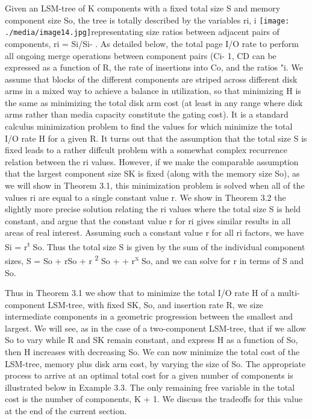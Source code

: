 \documentclass[a4paper,12pt,notitlepage,twoside,openright]{article}
\begin{document}
Given an LSM-tree of K components with a fixed total size S and memory
component size So, the tree is totally described by the variables ri, i
\texttt{[image: ./media/image14.jpg]}representating
size ratios between adjacent pairs of components, ri = Si/Si- . As
detailed below, the total page I/O rate to perform all ongoing merge
operations between component pairs (Ci- 1, CD can be expressed as a
function of R, the rate of insertions into Co, and the ratios "i. We
assume that blocks of the different components are striped across
different disk arms in a mixed way to achieve a balance in utilization,
so that minimizing H is the same as minimizing the total disk arm cost
(at least in any range where disk arms rather than media capacity
constitute the gating cost). It is a standard calculus minimization
problem to find the values for which minimize the total I/O rate H for a
given R. It turns out that the assumption that the total size S is fixed
leads to a rather diffcult problem with a somewhat complex recurrence
relation between the ri values. However, if we make the comparable
assumption that the largest component size SK is fixed (along with the
memory size So), as we will show in Theorem 3.1, this minimization
problem is solved when all of the values ri are equal to a single
constant value r. We show in Theorem 3.2 the slightly more precise
solution relating the ri values where the total size S is held constant,
and argue that the constant value r for ri gives similar results in all
areas of real interest. Assuming such a constant value r for all ri
factors, we have Si = r\textsuperscript{t} So. Thus the total size S is
given by the sum of the individual component sizes, S = So + rSo + r
\textsuperscript{2} So + + r\textsuperscript{x} So, and we can solve for
r in terms of S and So.

Thus in Theorem 3.1 we show that to minimize the total I/O rate H of a
multi-component LSM-tree, with fixed SK, So, and insertion rate R, we
size intermediate components in a geometric progression between the
smallest and largest. We will see, as in the case of a two-component
LSM-tree, that if we allow So to vary while R and SK remain constant,
and express H as a function of So, then H increases with decreasing So.
We can now minimize the total cost of the LSM-tree, memory plus disk arm
cost, by varying the size of So. The appropriate process to arrive at an
optimal total cost for a given number of components is illustrated below
in Example 3.3. The only remaining free variable in the total cost is
the number of components, K + 1. We discuss the tradeoffs for this value
at the end of the current section.
\end{document}

